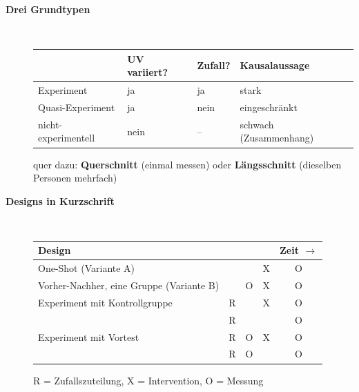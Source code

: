 \begin{description}
\item[{\rot\bf Drei Grundtypen}]~\\[-\lblskip]
\begin{center}
\renewcommand{\arraystretch}{1.25}
\begin{tabular}{p{}p{}p{}p{}}
\toprule
& \textbf{UV variiert?} & \textbf{Zufall?} & \textbf{Kausalaussage} \\
\midrule
Experiment & ja & ja & stark \\
Quasi-Experiment & ja & nein & eingeschränkt \\
nicht-experimentell & nein & -- & schwach (Zusammenhang) \\
\bottomrule
\end{tabular}
\end{center}
\bi
  \ite quer dazu: \textbf{Querschnitt} (einmal messen) oder
    \textbf{Längsschnitt} (dieselben Personen mehrfach)
\ei
\os{\newpage}

\item[{\rot\bf Designs in Kurzschrift}]~\\[-\lblskip]
\begin{center}
\renewcommand{\arraystretch}{1.3}
\begin{tabular}{p{}cccc}
\toprule
\textbf{Design} & & & & \textbf{Zeit $\rightarrow$} \\
\midrule
One-Shot (Variante A) & & & X & O \\
Vorher-Nachher, eine Gruppe (Variante B) & & O & X & O \\
\midrule
Experiment mit Kontrollgruppe & {\color{rwuviolet}R} & & X & O \\
 & {\color{rwuviolet}R} & & & O \\
\midrule
Experiment mit Vortest & {\color{rwuviolet}R} & O & X & O \\
 & {\color{rwuviolet}R} & O & & O \\
\bottomrule
\end{tabular}
\end{center}
\bi
  \ite R = Zufallszuteilung, X = Intervention, O = Messung
\ei
\os{\newpage}
\end{description}

